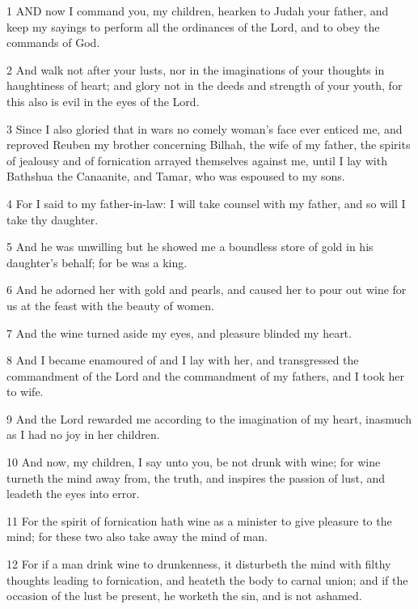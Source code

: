 \par 1 AND now I command you, my children, hearken to Judah your father, and keep my sayings to perform all the ordinances of the Lord, and to obey the commands of God.

\par 2 And walk not after your lusts, nor in the imaginations of your thoughts in haughtiness of heart; and glory not in the deeds and strength of your youth, for this also is evil in the eyes of the Lord.

\par 3 Since I also gloried that in wars no comely woman's face ever enticed me, and reproved Reuben my brother concerning Bilhah, the wife of my father, the spirits of jealousy and of fornication arrayed themselves against me, until I lay with Bathshua the Canaanite, and Tamar, who was espoused to my sons.

\par 4 For I said to my father-in-law: I will take counsel with my father, and so will I take thy daughter.

\par 5 And he was unwilling but he showed me a boundless store of gold in his daughter's behalf; for be was a king.

\par 6 And he adorned her with gold and pearls, and caused her to pour out wine for us at the feast with the beauty of women.

\par 7 And the wine turned aside my eyes, and pleasure blinded my heart.

\par 8 And I became enamoured of and I lay with her, and transgressed the commandment of the Lord and the commandment of my fathers, and I took her to wife.

\par 9 And the Lord rewarded me according to the imagination of my heart, inasmuch as I had no joy in her children.

\par 10 And now, my children, I say unto you, be not drunk with wine; for wine turneth the mind away from, the truth, and inspires the passion of lust, and leadeth the eyes into error.

\par 11 For the spirit of fornication hath wine as a minister to give pleasure to the mind; for these two also take away the mind of man.

\par 12 For if a man drink wine to drunkenness, it disturbeth the mind with filthy thoughts leading to fornication, and heateth the body to carnal union; and if the occasion of the lust be present, he worketh the sin, and is not ashamed.

